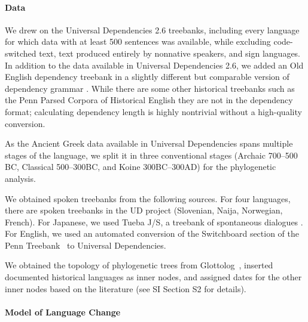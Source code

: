 \documentclass[11pt,a4paper]{article}
\begin{document}



\paragraph{Data}
We drew on the Universal Dependencies 2.6 treebanks, including every language for which data with at least 500 sentences was available, while excluding code-switched text, text produced entirely by nonnative speakers, and sign languages.
In addition to the data available in Universal Dependencies 2.6, we added an Old English dependency treebank in a slightly different but comparable version of dependency grammar \citep{bech2014iswoc}.
While there are some other historical treebanks such as the Penn Parsed Corpora of Historical English \citep{kroch2011penn} they are not in the dependency format; calculating dependency length is highly nontrivial without a high-quality conversion.

As the Ancient Greek data available in Universal Dependencies spans multiple stages of the language, we split it in three conventional stages (Archaic 700--500 BC, Classical 500--300BC, and Koine 300BC--300AD) for the phylogenetic analysis. 

We obtained spoken treebanks from the following sources.
For four languages, there are spoken treebanks in the UD project (Slovenian, Naija, Norwegian, French). For Japanese, we used Tueba J/S, a treebank of spontaneous dialogues \citep{hall2006conll}. For English, we used an automated conversion \citep{schuster2018sentences} of the Switchboard section of the Penn Treebank~\citep{marcus-building-1993} to Universal Dependencies.

We obtained the topology of phylogenetic trees from Glottolog~\citep{nordhoff2011glottolog}, inserted documented historical languages as inner nodes, and assigned dates for the other inner nodes based on the literature (see SI Section S2 for details).




\paragraph{Model of Language Change}

\end{document}
